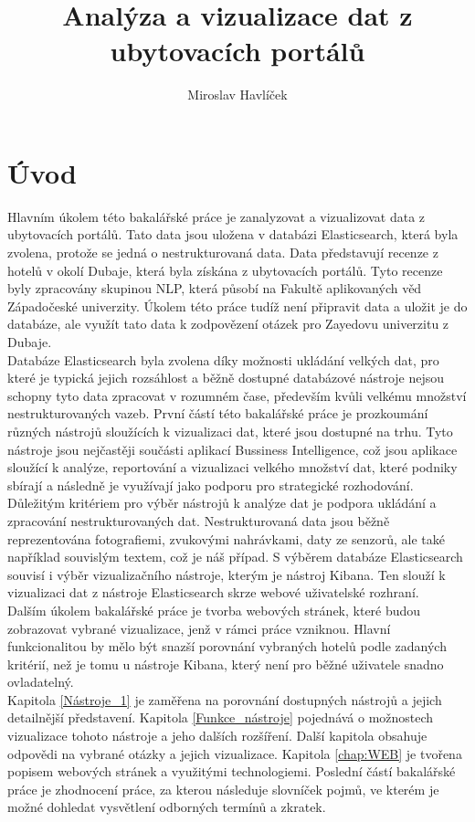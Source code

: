 \documentclass[czech,BP]{thesiskiv}
\author{Miroslav Havlíček}
\title{Analýza a vizualizace dat z ubytovacích portálů}
\begin{document}
%
\maketitle
\tableofcontents
\chapter{Úvod}
Hlavním úkolem této bakalářské práce je zanalyzovat a vizualizovat data z ubytovacích portálů. Tato data jsou uložena v databázi Elasticsearch, která byla zvolena, protože se jedná o nestrukturovaná data. Data představují recenze z hotelů v okolí Dubaje, která byla získána z ubytovacích portálů. Tyto recenze byly zpracovány skupinou NLP, která působí na Fakultě aplikovaných věd Západočeské univerzity. Úkolem této práce tudíž není připravit data a uložit je do databáze, ale využít tato data k zodpovězení otázek pro Zayedovu univerzitu z Dubaje.
\\
Databáze Elasticsearch byla zvolena díky možnosti ukládání velkých dat, pro které je typická jejich rozsáhlost a běžně dostupné databázové nástroje nejsou schopny tyto data zpracovat v rozumném čase, především kvůli velkému množství nestrukturovaných vazeb.\cite{BigData} První částí této bakalářské práce je prozkoumání různých nástrojů sloužících k vizualizaci dat, které jsou dostupné na trhu. Tyto nástroje jsou nejčastěji součásti aplikací Bussiness Intelligence, což jsou aplikace sloužící k analýze, reportování a vizualizaci velkého množství dat, které podniky sbírají a následně je využívají jako podporu pro strategické rozhodování. \\Důležitým kritériem pro výběr nástrojů k analýze dat je podpora ukládání a zpracování nestrukturovaných dat. Nestrukturovaná data jsou běžně reprezentována fotografiemi, zvukovými nahrávkami, daty ze senzorů, ale také například  souvislým textem, což je náš případ. S výběrem databáze Elasticsearch souvisí i výběr vizualizačního nástroje, kterým je nástroj Kibana. Ten slouží k vizualizaci dat z nástroje Elasticsearch skrze webové uživatelské rozhraní.
\\
Dalším úkolem bakalářské práce je tvorba webových stránek, které budou zobrazovat vybrané vizualizace, jenž v rámci práce vzniknou. Hlavní funkcionalitou by mělo být snazší porovnání vybraných hotelů podle zadaných kritérií, než je tomu u nástroje Kibana, který není pro běžné uživatele snadno ovladatelný.
\\
Kapitola \ref{Nástroje_1} je zaměřena na porovnání dostupných nástrojů a jejich detailnější představení. Kapitola \ref{Funkce_nástroje} pojednává o možnostech vizualizace tohoto nástroje a jeho dalších rozšíření. Další kapitola obsahuje odpovědi na vybrané otázky a jejich vizualizace. Kapitola \ref{chap:WEB} je tvořena popisem webových stránek a využitými technologiemi. Poslední částí bakalářské práce je zhodnocení práce, za kterou následuje slovníček pojmů, ve kterém je možné dohledat vysvětlení odborných termínů a zkratek.
\end{document}
